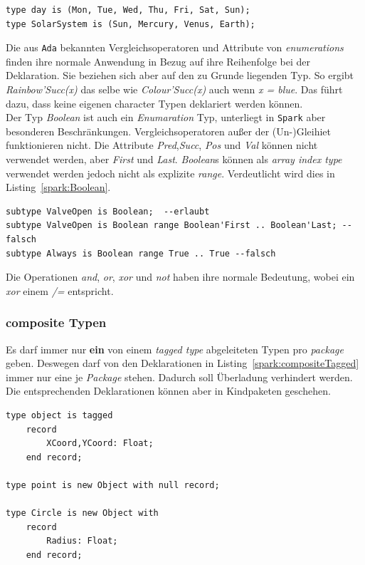 \begin{lstlisting}[caption={Literale überladen}, label=spark:literaleUeberladen]
type day is (Mon, Tue, Wed, Thu, Fri, Sat, Sun);
type SolarSystem is (Sun, Mercury, Venus, Earth);
\end{lstlisting}

Die aus \texttt{Ada} bekannten Vergleichsoperatoren und Attribute von \textit{enumerations} finden ihre normale Anwendung in Bezug auf ihre Reihenfolge bei der Deklaration. Sie beziehen sich aber auf den zu Grunde liegenden Typ. So ergibt \textsl{Rainbow'Succ(x)} das selbe wie \textsl{Colour'Succ(x)} auch wenn \textsl{x = blue}. Das führt dazu, dass keine eigenen character Typen deklariert werden können.\\
Der Typ \textit{Boolean} ist auch ein \textit{Enumaration} Typ, unterliegt in \texttt{Spark} aber besonderen Beschränkungen. Vergleichsoperatoren außer der (Un-)Gleihiet funktionieren nicht. Die Attribute \textit{Pred},\textit{Succ}, \textit{Pos} und \textit{Val} können nicht verwendet werden, aber \textit{First} und \textit{Last}. \textit{Boolean}s können als \textit{array index type} verwendet werden jedoch nicht als explizite \textit{range}. Verdeutlicht wird dies in Listing~\ref{spark:Boolean}.

\begin{lstlisting}[caption={Boolean}, label=spark:Boolean]
subtype ValveOpen is Boolean;  --erlaubt
subtype ValveOpen is Boolean range Boolean'First .. Boolean'Last; --falsch
subtype Always is Boolean range True .. True --falsch
\end{lstlisting}

Die Operationen \textit{and}, \textit{or}, \textit{xor} und \textit{not} haben ihre normale Bedeutung, wobei ein \textit{xor} einem \textit{/=} entspricht. 


\subsubsection{composite Typen}
\label{subsubsec:compositeTypen}
Es darf immer nur \textbf{ein} von einem \textit{tagged type} abgeleiteten Typen pro \textit{package} geben. Deswegen darf von den Deklarationen in Listing~\ref{spark:compositeTagged} immer nur eine je \textit{Package} stehen. Dadurch soll Überladung verhindert werden. Die entsprechenden Deklarationen können aber in Kindpaketen geschehen.

\begin{lstlisting}[caption={tagged types}, label=spark:compositeTagged]
type object is tagged
	record
		XCoord,YCoord: Float;
	end record;

type point is new Object with null record;

type Circle is new Object with
	record
		Radius: Float;
	end record;
\end{lstlisting}

